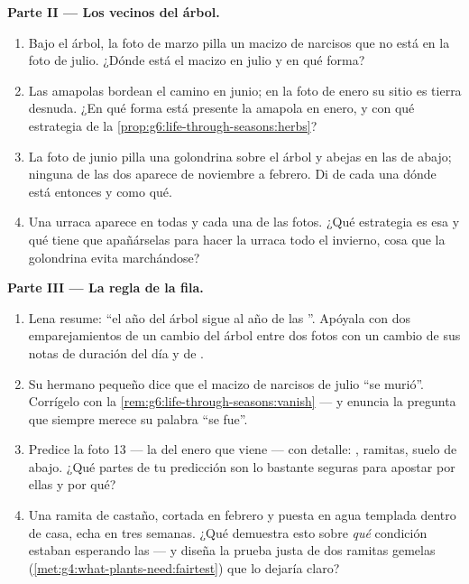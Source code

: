 \begin{problem}
\medskip\noindent\textbf{Parte II --- Los vecinos del árbol.}
\begin{enumerate}[resume]
  \item Bajo el árbol, la foto de marzo pilla un macizo de narcisos
        que no está en la foto de julio. ¿Dónde está el macizo en
        julio y en qué forma?
  \item Las amapolas bordean el camino en junio; en la foto de enero
        su sitio es tierra desnuda. ¿En qué forma está presente la
        amapola en enero, y con qué estrategia de la
        \cref{prop:g6:life-through-seasons:herbs}?
  \item La foto de junio pilla una golondrina sobre el árbol y abejas
        en las  de abajo; ninguna de las dos aparece de noviembre
        a febrero. Di de cada una dónde está entonces y como qué.
  \item Una urraca aparece en todas y cada una de las fotos. ¿Qué
        estrategia  es esa y qué tiene que apañárselas para
        hacer la urraca todo el invierno, cosa que la golondrina evita
        marchándose?
\end{enumerate}

\medskip\noindent\textbf{Parte III --- La regla de la fila.}
\begin{enumerate}[resume]
  \item Lena resume: ``el año del árbol sigue al año de las
        ''. Apóyala con dos emparejamientos de un cambio del
        árbol entre dos fotos con un cambio de sus notas de duración
        del día y de .
  \item Su hermano pequeño dice que el macizo de narcisos de julio
        ``se murió''. Corrígelo con la
        \cref{rem:g6:life-through-seasons:vanish} --- y enuncia la
        pregunta que siempre merece su palabra ``se fue''.
  \item Predice la foto 13 --- la del enero que viene --- con detalle:
        , ramitas, suelo de abajo. ¿Qué partes de tu predicción
        son lo bastante seguras para apostar por ellas y por qué?
  \item Una ramita de castaño, cortada en febrero y puesta en agua
        templada dentro de casa, echa  en tres semanas. ¿Qué
        demuestra esto sobre \emph{qué} condición estaban esperando las
         --- y diseña la prueba justa de dos ramitas gemelas
        (\cref{met:g4:what-plants-need:fairtest}) que lo dejaría claro?
\end{enumerate}
\end{problem}
